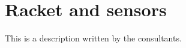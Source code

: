 \chapter{Racket and sensors}
\label{ch:racketSensors}
This is a description written by the consultants.

